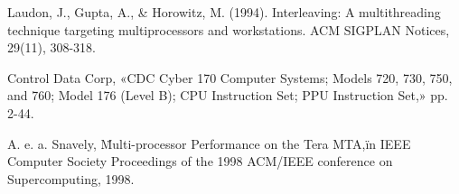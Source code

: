 \begin{thebibliography}{99}
 Laudon, J., Gupta, A., \& Horowitz, M. (1994). Interleaving: A multithreading technique targeting multiprocessors and workstations. ACM SIGPLAN Notices, 29(11), 308-318.

Control Data Corp, «CDC Cyber 170 Computer Systems; Models 720, 730, 750, and 760; Model 176 (Level B); CPU Instruction Set; PPU Instruction Set,» pp. 2-44.

A. e. a. Snavely, \"Multi-processor Performance on the Tera MTA,\" in IEEE Computer Society Proceedings of the 1998 ACM/IEEE conference on Supercomputing, 1998. 


\end{thebibliography}